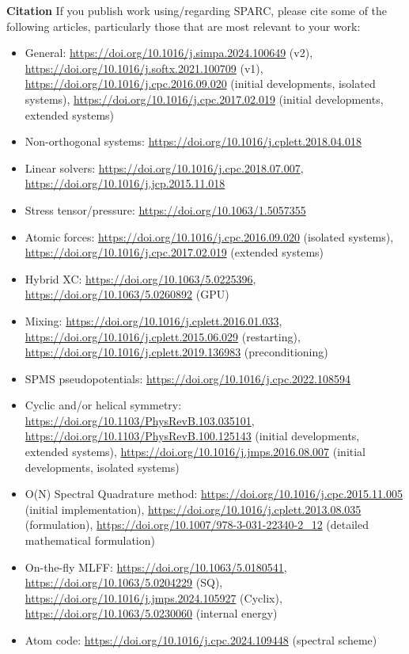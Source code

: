 \begin{frame}[allowframebreaks]{\textbf{Citation}} \label{Citation}
If you publish work using/regarding SPARC, please cite some of the following articles, particularly those that are most relevant to your work:
\begin{itemize}
    \item General: \url{https://doi.org/10.1016/j.simpa.2024.100649} (v2), \url{https://doi.org/10.1016/j.softx.2021.100709} (v1), \url{https://doi.org/10.1016/j.cpc.2016.09.020} (initial developments, isolated systems), \url{https://doi.org/10.1016/j.cpc.2017.02.019} (initial developments, extended systems)
    \item Non-orthogonal systems: \url{https://doi.org/10.1016/j.cplett.2018.04.018}
    \item Linear solvers: \url{https://doi.org/10.1016/j.cpc.2018.07.007}, \url{https://doi.org/10.1016/j.jcp.2015.11.018}
    \item Stress tensor/pressure: \url{https://doi.org/10.1063/1.5057355}
    \item Atomic forces: \url{https://doi.org/10.1016/j.cpc.2016.09.020} (isolated systems), \url{https://doi.org/10.1016/j.cpc.2017.02.019} (extended systems)
    \item Hybrid XC:
    \url{https://doi.org/10.1063/5.0225396}, \url{https://doi.org/10.1063/5.0260892} (GPU)
    \item Mixing: \url{https://doi.org/10.1016/j.cplett.2016.01.033}, \url{https://doi.org/10.1016/j.cplett.2015.06.029} (restarting), \url{https://doi.org/10.1016/j.cplett.2019.136983} (preconditioning)
    \item SPMS pseudopotentials: \url{https://doi.org/10.1016/j.cpc.2022.108594}
    \item Cyclic and/or helical symmetry:
    \url{https://doi.org/10.1103/PhysRevB.103.035101},
    \url{https://doi.org/10.1103/PhysRevB.100.125143} (initial developments, extended systems),
    \url{https://doi.org/10.1016/j.jmps.2016.08.007} (initial developments, isolated systems)
    \item O(N) Spectral Quadrature method:
    \url{https://doi.org/10.1016/j.cpc.2015.11.005} (initial implementation),
    \url{https://doi.org/10.1016/j.cplett.2013.08.035} (formulation),
    \url{https://doi.org/10.1007/978-3-031-22340-2_12} (detailed mathematical formulation)
    \item On-the-fly MLFF:
    \url{https://doi.org/10.1063/5.0180541}, \url{https://doi.org/10.1063/5.0204229} (SQ), \url{https://doi.org/10.1016/j.jmps.2024.105927} (Cyclix), \url{https://doi.org/10.1063/5.0230060} (internal energy)
    \item Atom code:
    \url{https://doi.org/10.1016/j.cpc.2024.109448} (spectral scheme)
\end{itemize}
\end{frame}
  
